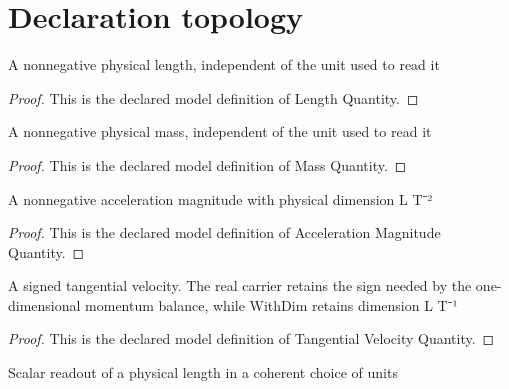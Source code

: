\section{Declaration topology}
\begin{definition}
  \label{def:physics:phyx-mini-0767:phyxminiproblems-problemphyxmini0767-lengthquantity}
  A nonnegative physical length, independent of the unit used to read it
\end{definition}
\begin{proof}
  This is the declared model definition of Length Quantity.
\end{proof}
\begin{definition}
  \label{def:physics:phyx-mini-0767:phyxminiproblems-problemphyxmini0767-massquantity}
  A nonnegative physical mass, independent of the unit used to read it
\end{definition}
\begin{proof}
  This is the declared model definition of Mass Quantity.
\end{proof}
\begin{definition}
  \label{def:physics:phyx-mini-0767:phyxminiproblems-problemphyxmini0767-accelerationmagnitudequantity}
  A nonnegative acceleration magnitude with physical dimension L T⁻²
\end{definition}
\begin{proof}
  This is the declared model definition of Acceleration Magnitude Quantity.
\end{proof}
\begin{definition}
  \label{def:physics:phyx-mini-0767:phyxminiproblems-problemphyxmini0767-tangentialvelocityquantity}
  A signed tangential velocity. The real carrier retains the sign needed by the one-dimensional momentum balance, while WithDim retains dimension L T⁻¹
\end{definition}
\begin{proof}
  This is the declared model definition of Tangential Velocity Quantity.
\end{proof}
\begin{definition}
  \label{def:physics:phyx-mini-0767:phyxminiproblems-problemphyxmini0767-lengthreadout}
  Scalar readout of a physical length in a coherent choice of units
\end{definition}
